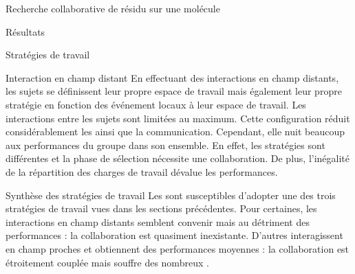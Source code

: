 \documentclass[myfrancais]{mythesis}
\begin{document}
\begin{mychapter}{Recherche collaborative de résidu sur une molécule}
\begin{mysection}{Résultats}
\begin{mysubsection}{Stratégies de travail}
\begin{mysubsubsection}{Interaction en champ distant}
					En effectuant des interactions en champ distants, les sujets se définissent leur propre espace de travail mais également leur propre stratégie en fonction des événement locaux à leur espace de travail.
					Les interactions entre les sujets sont limitées au maximum.
					Cette configuration réduit considérablement les  ainsi que la communication.
					Cependant, elle nuit beaucoup aux performances du groupe dans son ensemble.
					En effet, les stratégies sont différentes et la phase de sélection nécessite une collaboration.
					De plus, l'inégalité de la répartition des charges de travail dévalue les performances.
				\end{mysubsubsection}
				\begin{mysubsubsection}{Synthèse des stratégies de travail}
					Les  sont susceptibles d'adopter une des trois stratégies de travail vues dans les sections précédentes.
					Pour certaines, les interactions en champ distants semblent convenir mais au détriment des performances : la collaboration est quasiment inexistante.
					D'autres  interagissent en champ proches et obtiennent des performances moyennes : la collaboration est étroitement couplée mais souffre des nombreux .


\end{mysubsubsection}
\end{mysubsection}
\end{mysection}
\end{mychapter}
\end{document}
